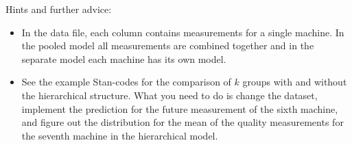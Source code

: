\documentclass[a4paper,11pt]{article}
\begin{document}
\noindent Hints and further advice:
\begin{itemize}

\item In the data file, each column contains measurements for a single machine. In the pooled model all measurements are combined together and in the separate model each machine has its own model.
\item See the example Stan-codes for the comparison of $k$ groups with and without the hierarchical structure. What you need to do is change the dataset, implement the prediction for the future measurement of the sixth machine, and figure out the distribution for the mean of the quality measurements for the seventh machine in the hierarchical model.




\end{itemize}
\end{document}
